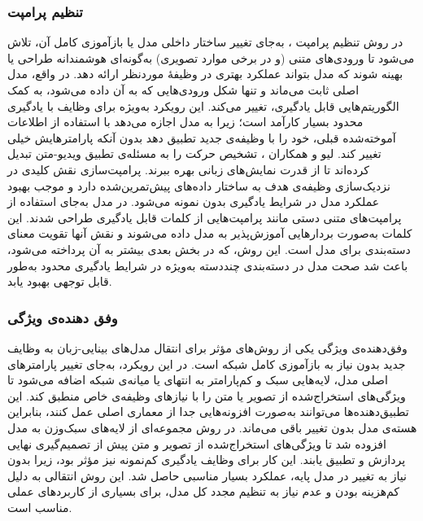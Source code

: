 \subsubsection{تنظیم پرامپت}
در روش تنظیم پرامپت
،
 به‌جای تغییر ساختار داخلی مدل یا بازآموزی کامل آن، تلاش می‌شود تا ورودی‌های متنی (و در برخی موارد تصویری) به‌گونه‌ای هوشمندانه طراحی یا بهینه شوند که مدل بتواند عملکرد بهتری در وظیفۀ موردنظر ارائه دهد. در واقع، مدل اصلی ثابت می‌ماند و تنها شکل ورودی‌هایی که به آن داده می‌شود، به کمک الگوریتم‌هایی قابل یادگیری، تغییر می‌کند. این رویکرد به‌ویژه برای وظایف با یادگیری محدود بسیار کارآمد است؛ زیرا به مدل اجازه می‌دهد با استفاده از اطلاعات آموخته‌شده قبلی، خود را با وظیفه‌ی جدید تطبیق دهد بدون آنکه پارامتر‌هایش خیلی تغییر کند. لیو و همکاران 
\cite{actionclip}،
تشخیص حرکت را به مسئله‌ی تطبیق ویدیو-متن تبدیل کرده‌اند تا از قدرت نمایش‌های زبانی بهره ببرند. پرامپت‌سازی نقش کلیدی در نزدیک‌سازی وظیفه‌ی هدف به ساختار داده‌های پیش‌تمرین‌شده دارد و موجب بهبود عملکرد مدل در شرایط یادگیری بدون نمونه می‌شود. در مدل 
\cite{CoOp}
به‌جای استفاده از پرامپت‌های متنی دستی مانند
پرامپت‌هایی از کلمات قابل یادگیری طراحی شدند. این کلمات به‌صورت بردارهایی آموزش‌پذیر به مدل داده می‌شوند و نقش آنها تقویت معنای دسته‌بندی برای مدل است. این روش، که در بخش بعدی بیشتر به آن پرداخته می‌شود، باعث شد صحت مدل
در دسته‌بندی چند‌دسته به‌ویژه در شرایط یادگیری محدود به‌طور قابل توجهی بهبود یابد. 

\subsubsection{وفق دهنده‌ی ویژگی}
وفق‌دهنده‌ی ویژگی
یکی از روش‌های مؤثر برای انتقال مدل‌های بینایی-زبان به وظایف جدید بدون نیاز به بازآموزی کامل شبکه است. در این رویکرد، به‌جای تغییر پارامتر‌های اصلی مدل، لایه‌هایی سبک و کم‌پارامتر به انتهای یا میانه‌ی شبکه اضافه می‌شود تا ویژگی‌های استخراج‌شده از تصویر یا متن را با نیازهای وظیفه‌ی خاص منطبق کند. این تطبیق‌دهنده‌ها  می‌توانند به‌صورت افزونه‌هایی جدا از معماری اصلی عمل کنند، بنابراین هسته‌ی مدل بدون تغییر باقی می‌ماند. در روش 
\cite{CLIP-Adapter}
مجموعه‌ای از لایه‌های سبک‌وزن به مدل
افزوده شد تا ویژگی‌های استخراج‌شده از تصویر و متن پیش از تصمیم‌گیری نهایی پردازش و تطبیق یابند. این کار برای وظایف یادگیری کم‌نمونه نیز مؤثر بود، زیرا بدون نیاز به تغییر در مدل پایه، عملکرد بسیار مناسبی حاصل شد. این روش انتقالی به دلیل کم‌هزینه بودن و عدم نیاز به تنظیم مجدد کل مدل، برای بسیاری از کاربردهای عملی مناسب است.

